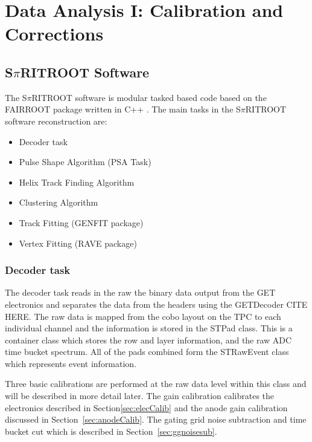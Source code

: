 \chapter{Data Analysis I: Calibration and Corrections}

\section{S$\pi$RITROOT Software}
\label{sec:software}

The S$\pi$RITROOT software is modular tasked based code based on the FAIRROOT package written in C++ \cite{fairroot}. The main tasks in the S$\pi$RITROOT software reconstruction are:
\begin{itemize}
  \item Decoder task
  \item Pulse Shape Algorithm (PSA Task)
  \item Helix Track Finding Algorithm
  \item Clustering Algorithm
  \item Track Fitting (GENFIT package)
  \item Vertex Fitting (RAVE package)
\end{itemize}


\subsection{Decoder task}
The decoder task reads in the raw the binary data output from the GET electronics and separates the data from the headers using the GETDecoder CITE HERE. The raw data is mapped from the cobo layout on the TPC to each individual channel and the information is stored in the STPad class. This is a container class which stores the row and layer information, and the raw ADC time bucket spectrum. All of the pads combined form the STRawEvent class which represents event information. 

Three basic calibrations are performed at the raw data level within this class and will be described in more detail later. The gain calibration calibrates the electronics described in Section\ref{sec:elecCalib} and the anode gain calibration discussed in Section~\ref{sec:anodeCalib}. The gating grid noise subtraction and time bucket cut which is described in Section~\ref{sec:ggnoisesub}.


